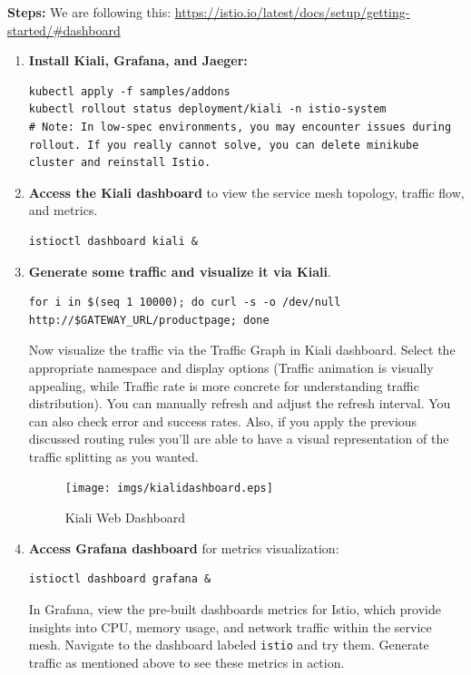 \documentclass{article}
\begin{document}
\textbf{Steps:}
We are following this: \footnotesize\url{https://istio.io/latest/docs/setup/getting-started/#dashboard}
\normalsize
\begin{enumerate}
\item \textbf{Install Kiali, Grafana, and Jaeger:}
\begin{lstlisting}
kubectl apply -f samples/addons
kubectl rollout status deployment/kiali -n istio-system
# Note: In low-spec environments, you may encounter issues during rollout. If you really cannot solve, you can delete minikube cluster and reinstall Istio.
\end{lstlisting}

\item \textbf{Access the Kiali dashboard} to view the service mesh topology, traffic flow, and metrics.
\begin{lstlisting}
istioctl dashboard kiali &
\end{lstlisting}

\item \textbf{Generate some traffic and visualize it via Kiali}.
\begin{lstlisting}
for i in $(seq 1 10000); do curl -s -o /dev/null http://$GATEWAY_URL/productpage; done
\end{lstlisting}
Now visualize the traffic via the Traffic Graph in Kiali dashboard. Select the appropriate namespace and display options (Traffic animation is visually appealing, while Traffic rate is more concrete for understanding traffic distribution). You can manually refresh and adjust the refresh interval.
You can also check error and success rates. Also, if you apply the previous discussed routing rules you'll are able to have a visual representation of the traffic splitting as you wanted.

\begin{figure}[H]
    \centering
    \texttt{[image: imgs/kialidashboard.eps]}
    \caption{Kiali Web Dashboard}
\end{figure}

\item \textbf{Access Grafana dashboard} for metrics visualization:
\begin{lstlisting}
istioctl dashboard grafana &
\end{lstlisting}
In Grafana, view the pre-built dashboards metrics for Istio, which provide insights into CPU, memory usage, and network traffic within the service mesh. Navigate to the dashboard labeled \texttt{istio} and try them. Generate traffic as mentioned above to see these metrics in action.


\end{enumerate}
\end{document}
